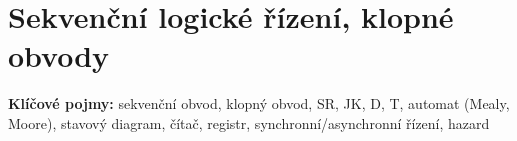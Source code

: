\documentclass[a4paper,10pt]{article}
\begin{document}


\newpage

\section{Sekvenční logické řízení, klopné obvody}

\begin{pojmybox}
\textbf{Klíčové pojmy:}
sekvenční obvod, klopný obvod, SR, JK, D, T,
automat (Mealy, Moore), stavový diagram, čítač, registr,
synchronní/asynchronní řízení, hazard
\end{pojmybox}
\end{document}
